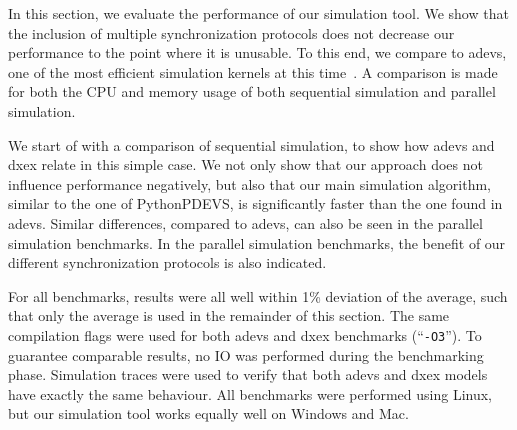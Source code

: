 In this section, we evaluate the performance of our simulation tool.
We show that the inclusion of multiple synchronization protocols does not decrease our performance to the point where it is unusable.
To this end, we compare to adevs, one of the most efficient simulation kernels at this time~\cite{DEVSSurvey}.
A comparison is made for both the CPU and memory usage of both sequential simulation and parallel simulation.

We start of with a comparison of sequential simulation, to show how adevs and dxex relate in this simple case.
We not only show that our approach does not influence performance negatively, but also that our main simulation algorithm, similar to the one of PythonPDEVS, is significantly faster than the one found in adevs.
Similar differences, compared to adevs, can also be seen in the parallel simulation benchmarks.
In the parallel simulation benchmarks, the benefit of our different synchronization protocols is also indicated.

For all benchmarks, results were all well within 1\% deviation of the average, such that only the average is used in the remainder of this section.
The same compilation flags were used for both adevs and dxex benchmarks (``\texttt{-O3}'').
To guarantee comparable results, no IO was performed during the benchmarking phase.
Simulation traces were used to verify that both adevs and dxex models have exactly the same behaviour.
All benchmarks were performed using Linux, but our simulation tool works equally well on Windows and Mac.

